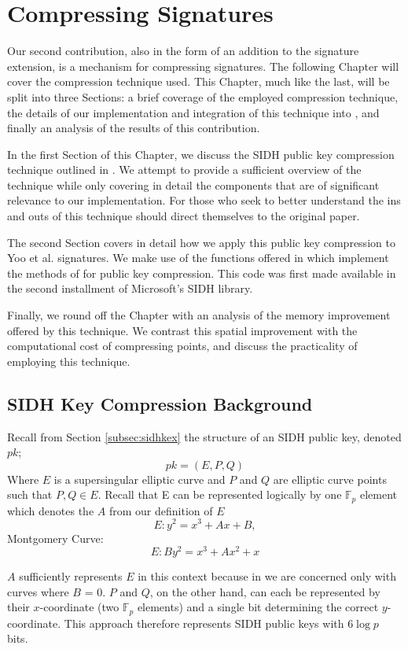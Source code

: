 \chapter{Compressing Signatures}
\label{sec:compress}

Our second contribution, also in the form of an addition to the \sidh signature extension, is a mechanism for compressing signatures. The following Chapter will cover the compression technique used. This Chapter, much like the last, will be split into three Sections: a brief coverage of the employed compression technique, the details of our implementation and integration of this technique into \sidh, and finally an analysis of the results of this contribution.

In the first Section of this Chapter, we discuss the SIDH public key compression technique outlined in \cite{compwr}. We attempt to provide a sufficient overview of the technique while only covering in detail the components that are of significant relevance to our implementation. For those who seek to better understand the ins and outs of this technique should direct themselves to the original paper.  

The second Section covers in detail how we apply this public key compression to Yoo et al. signatures. We make use of the functions offered in \cite{pkcomp} which implement the methods of \cite{compwr} for public key compression. This code was first made available in the second installment of Microsoft's SIDH library.

Finally, we round off the Chapter with an analysis of the memory improvement offered by this technique. We contrast this spatial improvement with the computational cost of compressing points, and discuss the practicality of employing this technique. 

\section{SIDH Key Compression Background}

Recall from Section \ref{subsec:sidhkex} the structure of an SIDH public key, denoted $pk$;
$$
pk = (E, P, Q)
$$
Where $E$ is a supersingular elliptic curve and $P$ and $Q$ are elliptic curve points such that $P, Q \in E$. Recall that E can be represented logically by one $\mathbb{F}_{p}$ element which denotes the $A$ from our definition of $E$
$$
E : y^2 = x^3 + Ax + B,
$$
Montgomery Curve:
$$
E: By^2 = x^3 + Ax^2 + x
$$

$A$ sufficiently represents $E$ in this context because in \sidh we are concerned only with curves where $B$ = 0. $P$ and $Q$, on the other hand, can each be represented by their $x$-coordinate (two $\mathbb{F}_{p}$ elements) and a single bit determining the correct $y$-coordinate. This approach therefore represents SIDH public keys with $6\log p$ bits.

